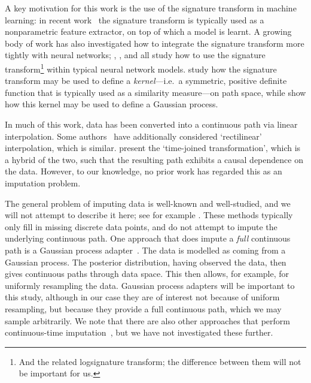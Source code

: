 \documentclass{article}
\begin{document}
A key motivation for this work is the use of the signature transform in
machine learning: in recent work~\citep{primer2016,
kormilitzlin2016, yang2016rotation, li2017lpsnet, yang2017leveraging,
PerezArribas2018, morrill2019sepsis} the signature transform is
typically used as a nonparametric feature extractor, on top of which
a model is learnt. A growing body of work has also investigated how to
integrate the signature transform more tightly with neural networks; 
\citet{jeremythesis}, \citet{logsigrnn}, and \citet{kidger2019deep} all
study how to use the signature transform\footnote{And the related
logsignature transform; the difference between them will not be
important for us.} within typical neural network models.
\citet{chevyrev2018signature, kiraly2019kernels} study how the signature
transform may be used to define a \emph{kernel}---i.e.\ a symmetric,
positive definite function that is typically used as a similarity
measure---on path space, while \citet{toth2019gp} show how this kernel
may be used to define a Gaussian process.

In much of this work, data has been converted into a continuous path via
linear interpolation. Some authors~\citep{primer2016,
fermanian2019embedding} have additionally considered `rectilinear'
interpolation, which is similar. \citet{levin2013} present the
`time-joined transformation', which is a hybrid of the two, such that
the resulting path exhibits a causal dependence on the data.  However,
to our knowledge, no prior work has regarded this as an imputation
problem.

The general problem of imputing data is well-known and well-studied, and
we will not attempt to describe it here; see for example \citet[Chapter 25]{gelman2007dataanalysis}.
These methods typically only fill in missing discrete data points, and do not attempt to impute the underlying continuous path.
%
One approach that does impute a \emph{full} continuous path is
a Gaussian process adapter~\citep{li2016scalable, futoma2017mgp}. The
data is modelled as coming from a Gaussian process. The posterior
distribution, having observed the data, then gives continuous paths
through data space. This then allows, for example, for uniformly
resampling the data. Gaussian process adapters will be important to this
study, although in our case they are of interest not because of uniform
resampling, but because they provide a full continuous path, which we may
sample arbitrarily. We note that there are also other approaches that
perform continuous-time imputation~\citep{shukla2018interpolationprediction},
but we have not investigated these further.
\end{document}
